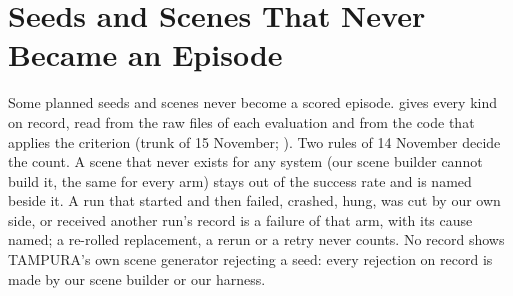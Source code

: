 \section{Seeds and Scenes That Never Became an Episode}
\label{sec:rejections}

Some planned seeds and scenes never become a scored episode.  gives
every kind on record, read from the raw files of each evaluation and from the code that
applies the criterion (trunk of 15 November; ). Two rules
of 14 November decide the count. A scene that never exists for any system (our scene
builder cannot build it, the same for every arm) stays out of the success rate and is
named beside it. A run that started and then failed, crashed, hung, was cut by our own
side, or received another run's record is a failure of that arm, with its cause named; a
re-rolled replacement, a rerun or a retry never counts. No record shows TAMPURA's own
scene generator rejecting a seed: every rejection on record is made by our scene builder
or our harness.

